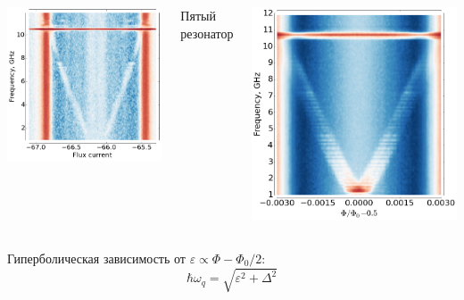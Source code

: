 \documentclass[aspectratio=169, 13pt]{beamer}
\begin{document}
{\begin{columns}[t]
\vspace{0.2cm}
\includegraphics[width=\textwidth]{two-tone_spectrum2}

\centering
Пятый резонатор

\vspace{0.2cm}
\includegraphics[width=\textwidth]{two-tone_spectrum3}

\end{columns}

\vspace{0.5cm}
Гиперболическая зависимость от $\varepsilon\propto \Phi - \Phi_0/2$:
\centering
\begin{equation*}
\hbar \omega_q = \sqrt{\varepsilon^2+\Delta^2}
\end{equation*}
}
\end{document}
